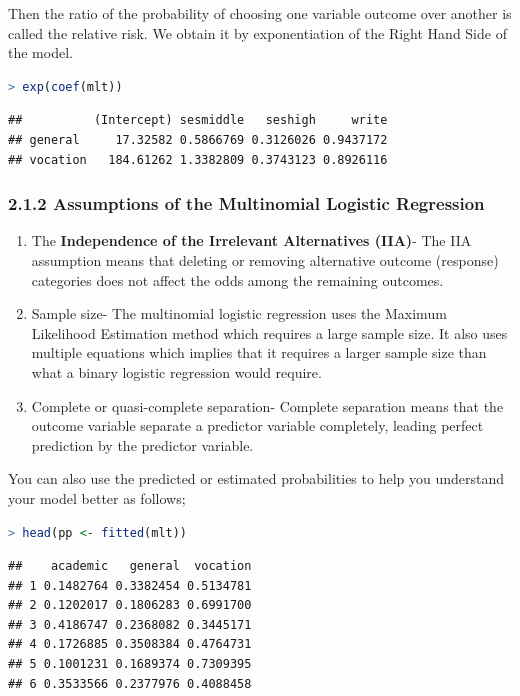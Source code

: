 \documentclass[
]{article}
\begin{document}
Then the ratio of the probability of choosing one variable outcome over
another is called the relative risk. We obtain it by exponentiation of
the Right Hand Side of the model.

\begin{lstlisting}[language=R]
> exp(coef(mlt))
\end{lstlisting}

\begin{lstlisting}
##          (Intercept) sesmiddle   seshigh     write
## general     17.32582 0.5866769 0.3126026 0.9437172
## vocation   184.61262 1.3382809 0.3743123 0.8926116
\end{lstlisting}

\hypertarget{assumptions-of-the-multinomial-logistic-regression}{%
\subsubsection{2.1.2 Assumptions of the Multinomial Logistic
Regression}\label{assumptions-of-the-multinomial-logistic-regression}}

\begin{enumerate}
\def\labelenumi{\arabic{enumi}.}
\item
  The \textbf{Independence of the Irrelevant Alternatives (IIA)}- The
  IIA assumption means that deleting or removing alternative outcome
  (response) categories does not affect the odds among the remaining
  outcomes.
\item
  Sample size- The multinomial logistic regression uses the Maximum
  Likelihood Estimation method which requires a large sample size. It
  also uses multiple equations which implies that it requires a larger
  sample size than what a binary logistic regression would require.
\item
  Complete or quasi-complete separation- Complete separation means that
  the outcome variable separate a predictor variable completely, leading
  perfect prediction by the predictor variable.
\end{enumerate}

You can also use the predicted or estimated probabilities to help you
understand your model better as follows;

\begin{lstlisting}[language=R]
> head(pp <- fitted(mlt))
\end{lstlisting}

\begin{lstlisting}
##    academic   general  vocation
## 1 0.1482764 0.3382454 0.5134781
## 2 0.1202017 0.1806283 0.6991700
## 3 0.4186747 0.2368082 0.3445171
## 4 0.1726885 0.3508384 0.4764731
## 5 0.1001231 0.1689374 0.7309395
## 6 0.3533566 0.2377976 0.4088458
\end{lstlisting}
\end{document}
